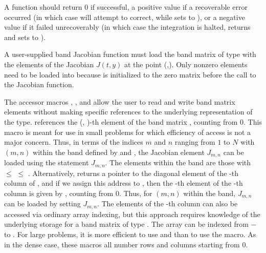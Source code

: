 {
  A  function should return 0 if successful, a positive value if a recoverable
  error occurred (in which case {\cvode} will attempt to correct, while {\cvband} sets
   to ), or a negative 
  value if it failed unrecoverably (in which case the integration is halted, 
  returns  and {\cvband} sets  to 
  ).
}
{
  A user-supplied band Jacobian function must load the band matrix 
  of type  with the elements of the Jacobian $J(t,y)$ at the
  point (,).  Only nonzero elements need to be loaded into
   because  is initialized to the zero matrix before the call to the
  Jacobian function.  

  The accessor macros , , and  
  allow the user to read and write band matrix elements without making specific 
  references to the underlying representation of the  type.
   references the (, )-th element of the 
  band matrix , counting from $0$.
  This macro is meant for use in small problems for which efficiency of access is not
  a major concern.  Thus, in terms of the indices $m$ and $n$ ranging from $1$ to
  $N$ with $(m,n)$ within the band defined by  and
  , the Jacobian element $J_{m,n}$ can be loaded using the 
  statement  $J_{m,n}$. The elements within
  the band are those with  $\le$  $\le$ .
  Alternatively,  returns a pointer to the diagonal element
  of the -th column of , and if we assign this address to 
  , then the -th element of the -th column is
  given by , counting from $0$.
  Thus, for $(m,n)$ within the band, $J_{m,n}$ can be loaded by setting 
   
  $J_{m,n}$.  The elements of the -th column can also be accessed
  via ordinary array indexing, but this approach requires knowledge of
  the underlying storage for a band matrix of type .  
  The array  can be indexed from $-$ to .
  For large problems, it is more efficient to use
   and  than to use the
   macro.  As in the dense case, these macros all number rows
  and columns starting from $0$.  

}
